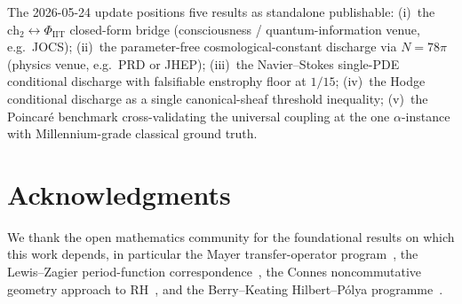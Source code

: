 \documentclass[11pt,a4paper]{article}
\theoremstyle{definition}
\theoremstyle{remark}
\begin{document}
The 2026-05-24 update positions five results as standalone publishable:
(i)~the $\mathrm{ch}_2 \leftrightarrow \Phi_{\mathrm{IIT}}$ closed-form
bridge (consciousness / quantum-information venue, e.g.\ JOCS);
(ii)~the parameter-free cosmological-constant discharge via $N = 78\pi$
(physics venue, e.g.\ PRD or JHEP); (iii)~the Navier--Stokes
single-PDE conditional discharge with falsifiable enstrophy floor at
$1/15$; (iv)~the Hodge conditional discharge as a single canonical-sheaf
threshold inequality; (v)~the Poincar\'e benchmark cross-validating the
universal coupling at the one $\alpha$-instance with Millennium-grade
classical ground truth.

\section*{Acknowledgments}
We thank the open mathematics community for the foundational results on
which this work depends, in particular the Mayer transfer-operator
program~\cite{mayer1991thermodynamic}, the Lewis--Zagier period-function
correspondence~\cite{lewis_zagier_2001}, the Connes noncommutative
geometry approach to RH~\cite{connes_trace_1998}, and the Berry--Keating
Hilbert--P\'olya programme~\cite{berry_keating_1999}.
\end{document}
